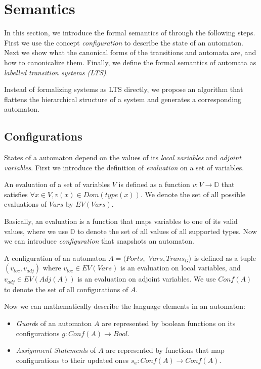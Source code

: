 \section{Semantics}
\label{sec:semantics}

In this section, we introduce the formal semantics of \lang{} through the following steps. First we use the concept \emph{configuration} to describe the state of an automaton. Next we show what the canonical forms of the transitions and automata are, and how to canonicalize them. Finally, we define the formal semantics of automata as \emph{labelled transition systems (LTS)}.

Instead of formalizing systems as LTS directly, we propose an algorithm that flattens the hierarchical structure of a system and generates a corresponding automaton.

\subsection{Configurations}
\label{subsec:config}
States of a \lang{} automaton depend on the values of its \emph{local variables} and \emph{adjoint variables}. First we introduce the definition of \emph{evaluation} on a set of variables. 

\begin{definition}[Evaluation]
An evaluation of a set of variables $V$ is defined as a function $v:V\rightarrow \mathbb{D}$ that satisfies $\forall x\in V,v(x)\in Dom(type(x))$. We denote the set of all possible evaluations of $Vars$ by $EV(Vars)$.
\end{definition}

Basically, an evaluation is a function that maps variables to one of its valid values, where we use $\mathbb{D}$ to denote the set of all values of all supported types. Now we can introduce \emph{configuration} that snapshots an automaton.

\begin{definition}[Configuration] A configuration of an automaton $A=\langle Ports,$ $Vars,Trans_G\rangle$ is defined as a tuple $(v_{loc},v_{adj})$ where $v_{loc}\in EV(Vars)$ is an evaluation on local variables, and $v_{adj}\in EV(Adj(A))$ is an evaluation on adjoint variables. We use $Conf(A)$ to denote the set of all configurations of $A$.
\end{definition}

Now we can mathematically describe the language elements in an automaton:
\begin{itemize}
    \item \emph{Guard}s of an automaton $A$ are represented by boolean functions on its configurations $g:Conf(A)\rightarrow Bool$.
    \item \emph{Assignment Statement}s of $A$ are represented by functions that map configurations to their updated ones $s_a:Conf(A)\rightarrow Conf(A)$.
\end{itemize}

